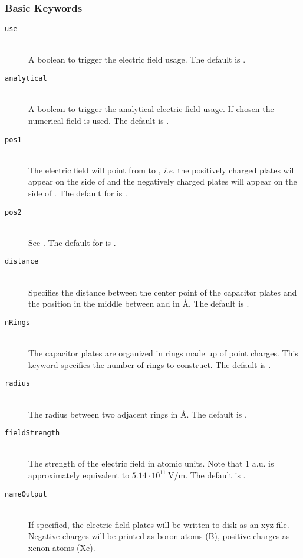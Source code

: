 \subsubsection{Basic Keywords}
\begin{description}
  \item [\texttt{use}]\hfill \\
  A boolean to trigger the electric field usage.
  The default is .
  \item [\texttt{analytical}]\hfill \\
  A boolean to trigger the analytical electric field usage. If chosen 
  the numerical field is used.
  The default is .
 \item [\texttt{pos1}]\hfill \\
  The electric field will point from  to , \emph{i.e.}
  the positively charged plates will appear on the side of  and 
  the negatively charged plates will appear on the side of .
  The default for  is .
 \item [\texttt{pos2}]\hfill \\
  See .
  The default for  is .
 \item [\texttt{distance}]\hfill \\
 Specifies the distance between the center point of the capacitor plates and 
 the position in the middle between  and  in \AA. The default is .
 \item [\texttt{nRings}]\hfill \\
 The capacitor plates are organized in rings made up of point charges. This keyword specifies the
 number of rings to construct. The default is .
 \item [\texttt{radius}]\hfill \\
 The radius between two adjacent rings in \AA. The default is .
 \item [\texttt{fieldStrength}]\hfill \\
 The strength of the electric field in atomic units. Note that 1 a.u. is
 approximately equivalent to $5.14\cdot 10^{11}~\mathrm{V/m}$. The default is .
 \item [\texttt{nameOutput}]\hfill \\
 If specified, the electric field plates will be written to disk as an xyz-file. Negative
 charges will be printed as boron atoms (B), positive charges as xenon atoms (Xe).
\end{description}

